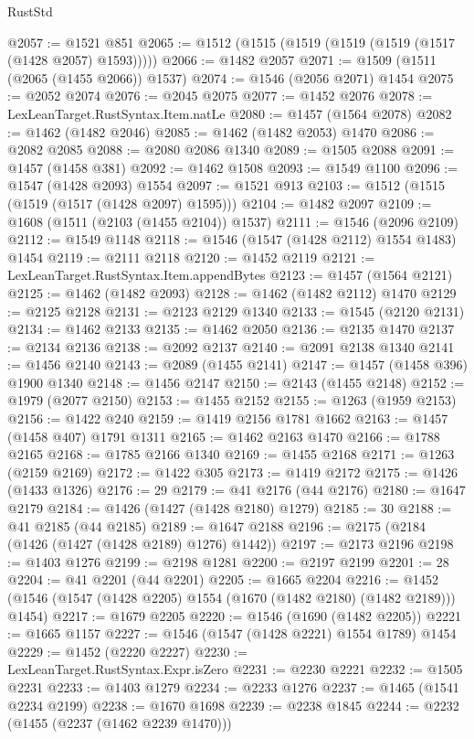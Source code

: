 \begin{lexlean}{RustStd}
\begin{coremodule}
@2057 := @1521 @851
@2065 := @1512 (@1515 (@1519 (@1519 (@1519 (@1517 (@1428 @2057) @1593)))))
@2066 := @1482 @2057
@2071 := @1509 (@1511 (@2065 (@1455 @2066)) @1537)
@2074 := @1546 (@2056 @2071) @1454
@2075 := @2052 @2074
@2076 := @2045 @2075
@2077 := @1452 @2076
@2078 := LexLeanTarget.RustSyntax.Item.natLe
@2080 := @1457 (@1564 @2078)
@2082 := @1462 (@1482 @2046)
@2085 := @1462 (@1482 @2053) @1470
@2086 := @2082 @2085
@2088 := @2080 @2086 @1340
@2089 := @1505 @2088
@2091 := @1457 (@1458 @381)
@2092 := @1462 @1508
@2093 := @1549 @1100
@2096 := @1547 (@1428 @2093) @1554
@2097 := @1521 @913
@2103 := @1512 (@1515 (@1519 (@1517 (@1428 @2097) @1595)))
@2104 := @1482 @2097
@2109 := @1608 (@1511 (@2103 (@1455 @2104)) @1537)
@2111 := @1546 (@2096 @2109)
@2112 := @1549 @1148
@2118 := @1546 (@1547 (@1428 @2112) @1554 @1483) @1454
@2119 := @2111 @2118
@2120 := @1452 @2119
@2121 := LexLeanTarget.RustSyntax.Item.appendBytes
@2123 := @1457 (@1564 @2121)
@2125 := @1462 (@1482 @2093)
@2128 := @1462 (@1482 @2112) @1470
@2129 := @2125 @2128
@2131 := @2123 @2129 @1340
@2133 := @1545 (@2120 @2131)
@2134 := @1462 @2133
@2135 := @1462 @2050
@2136 := @2135 @1470
@2137 := @2134 @2136
@2138 := @2092 @2137
@2140 := @2091 @2138 @1340
@2141 := @1456 @2140
@2143 := @2089 (@1455 @2141)
@2147 := @1457 (@1458 @396) @1900 @1340
@2148 := @1456 @2147
@2150 := @2143 (@1455 @2148)
@2152 := @1979 (@2077 @2150)
@2153 := @1455 @2152
@2155 := @1263 (@1959 @2153)
@2156 := @1422 @240
@2159 := @1419 @2156 @1781 @1662
@2163 := @1457 (@1458 @407) @1791 @1311
@2165 := @1462 @2163 @1470
@2166 := @1788 @2165
@2168 := @1785 @2166 @1340
@2169 := @1455 @2168
@2171 := @1263 (@2159 @2169)
@2172 := @1422 @305
@2173 := @1419 @2172
@2175 := @1426 (@1433 @1326)
@2176 := 29
@2179 := @41 @2176 (@44 @2176)
@2180 := @1647 @2179
@2184 := @1426 (@1427 (@1428 @2180) @1279)
@2185 := 30
@2188 := @41 @2185 (@44 @2185)
@2189 := @1647 @2188
@2196 := @2175 (@2184 (@1426 (@1427 (@1428 @2189) @1276) @1442))
@2197 := @2173 @2196
@2198 := @1403 @1276
@2199 := @2198 @1281
@2200 := @2197 @2199
@2201 := 28
@2204 := @41 @2201 (@44 @2201)
@2205 := @1665 @2204
@2216 := @1452 (@1546 (@1547 (@1428 @2205) @1554 (@1670 (@1482 @2180) (@1482 @2189))) @1454)
@2217 := @1679 @2205
@2220 := @1546 (@1690 (@1482 @2205))
@2221 := @1665 @1157
@2227 := @1546 (@1547 (@1428 @2221) @1554 @1789) @1454
@2229 := @1452 (@2220 @2227)
@2230 := LexLeanTarget.RustSyntax.Expr.isZero
@2231 := @2230 @2221
@2232 := @1505 @2231
@2233 := @1403 @1279
@2234 := @2233 @1276
@2237 := @1465 (@1541 @2234 @2199)
@2238 := @1670 @1698
@2239 := @2238 @1845
@2244 := @2232 (@1455 (@2237 (@1462 @2239 @1470)))

\end{coremodule}
\end{lexlean}
